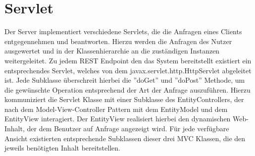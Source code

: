 \section{Servlet}


Der Server implementiert verschiedene Servlets, die die Anfragen eines Clients entgegennehmen und beantworten. Hierzu werden die Anfragen des Nutzer ausgewertet und in der Klassenhierarchie an die zuständigen Instanzen weitergeleitet. Zu jedem REST Endpoint den das System bereitstellt existiert ein entsprechendes Servlet, welches von dem javax.servlet.http.HttpServlet abgeleitet ist. Jede Subklasse überschreit hierbei die ''doGet'' und ''doPost'' Methode, um die gewünschte Operation entsprechend der Art der Anfrage auszuführen. Hierzu kommuniziert die Servlet Klasse mit einer Subklasse des EntityControllers, der nach dem Model-View-Controller Pattern mit dem EntityModel und dem EntityView interagiert. Der EntityView realisiert hierbei den dynamischen Web-Inhalt, der dem Benutzer auf Anfrage angezeigt wird. Für jede verfügbare Ansicht existierten entsprechende Subklassen dieser drei MVC Klassen, die den jeweils benötigten Inhalt bereitstellen. 

